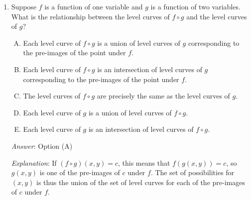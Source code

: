 \documentclass[10pt]{amsart}
\begin{document}
\begin{enumerate}
  {\em Answer}: Option (D)

  {\em Explanation}: This can be seen by noting that the slope of the
  line $ax + by = c$ is $-a/b$. It can also be seen using dot
  products. The expression $ax + by$ is the dot product of the vector
  $\langle a,b \rangle$ and the vector $\langle x,y \rangle$. To keep
  this dot product constant (i.e., move along a level curve) one must
  move along a vector orthogonal to $\langle a,b \rangle$. Of the
  given vectors, $\langle b,-a \rangle$ is orthogonal to $\langle a,b
  \rangle$.

  Note that it is true that all the lines are {\em perpendicular} to
  $\langle a,b \rangle$, but they are not parallel to $\langle a,b
  \rangle$.

  {\em Performance review}: $8$ out of $27$ got this. $12$ chose (B),
  $6$ chose (A), $1$ chose (E).

  {\em Historical note (last time)}: $5$ out of $21$ got the question
  correct. $14$ chose (A), $2$ chose (B).

\item Suppose $f$ is a function of one variable and $g$ is a function
  of two variables. What is the relationship between the level curves
  of $f \circ g$ and the level curves of $g$?

  \begin{enumerate}[(A)]
  \item Each level curve of $f \circ g$ is a union of level curves of
    $g$ corresponding to the pre-images of the point under $f$.
  \item Each level curve of $f \circ g$ is an intersection of level
    curves of $g$ corresponding to the pre-images of the point under $f$.
  \item The level curves of $f \circ g$ are precisely the same as the
    level curves of $g$.
  \item Each level curve of $g$ is a union of level curves of $f \circ g$.
  \item Each level curve of $g$ is an intersection of level curves of $f \circ g$.
  \end{enumerate}

  {\em Answer}: Option (A)

  {\em Explanation}: If $(f \circ g)(x,y) = c$, this means that
  $f(g(x,y)) = c$, so $g(x,y)$ is one of the pre-images of $c$ under
  $f$. The set of possibilities for $(x,y)$ is thus the union of the
  set of level curves for each of the pre-images of $c$ under $f$.
  

\end{enumerate}
\end{document}
